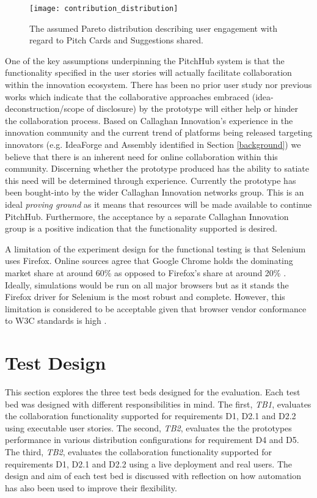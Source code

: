 \begin{figure}[ht]
    \centering
    \texttt{[image: contribution\_distribution]}
    \caption{The assumed Pareto distribution describing user engagement with regard to Pitch Cards and Suggestions shared.}
    \label{fig:contribution_distribution}
\end{figure}

One of the key assumptions underpinning the PitchHub system is that the functionality specified in the user stories will actually facilitate collaboration within the innovation ecosystem. There has been no prior user study nor previous works which indicate that the collaborative approaches embraced (idea-deconstruction/scope of disclosure) by the prototype will either help or hinder the collaboration process. Based on Callaghan Innovation's experience in the innovation community and the current trend of platforms being released targeting innovators (e.g. IdeaForge and Assembly identified in Section \ref{background}) we believe that there is an inherent need for online collaboration within this community. Discerning whether the prototype produced has the ability to satiate this need will be determined through experience. Currently the prototype has been bought-into by the wider Callaghan Innovation networks group. This is an ideal \textit{proving ground} as it means that resources will be made available to continue PitchHub. Furthermore, the acceptance by a separate Callaghan Innovation group is a positive indication that the functionality supported is desired.

A limitation of the experiment design for the functional testing is that Selenium uses Firefox. Online sources agree that Google Chrome holds the dominating market share at around 60\% as opposed to Firefox's share at around 20\% \cite{Brows6:online}. Ideally, simulations would be run on all major browsers but as it stands the Firefox driver for Selenium is the most robust and complete. However, this limitation is considered to be acceptable given that browser vendor conformance to W3C standards is high \cite{WebB1:online}.

\section{Test Design}
This section explores the three test beds designed for the evaluation. Each test bed was designed with different responsibilities in mind. The first, \textit{TB1}, evaluates the collaboration functionality supported for requirements D1, D2.1 and D2.2 using executable user stories. The second, \textit{TB2}, evaluates the the prototypes performance in various distribution configurations for requirement D4 and D5. The third, \textit{TB2}, evaluates the collaboration functionality supported for requirements D1, D2.1 and D2.2 using a live deployment and real users. The design and aim of each test bed is discussed with reflection on how automation has also been used to improve their flexibility.

